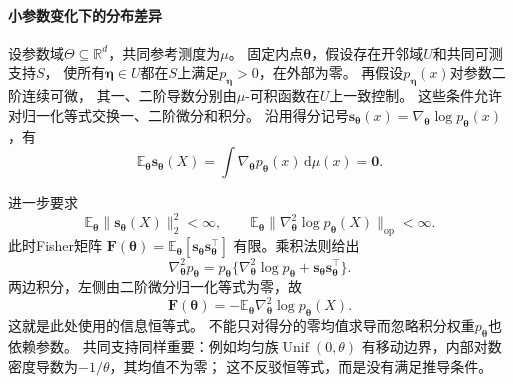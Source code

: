 \paragraph{小参数变化下的分布差异}
\label{sec:information-local-kl}

设参数域\(\Theta\subseteq\mathbb R^d\)，共同参考测度为\(\mu\)。
固定内点\(\bm\theta\)，假设存在开邻域\(U\)和共同可测支持\(S\)，
使所有\(\bm\eta\in U\)都在\(S\)上满足\(p_{\bm\eta}>0\)，在外部为零。
再假设\(p_{\bm\eta}(x)\)对参数二阶连续可微，
其一、二阶导数分别由\(\mu\)-可积函数在\(U\)上一致控制。
这些条件允许对归一化等式交换一、二阶微分和积分。
沿用得分记号\(\bm s_{\bm\theta}(x)=\nabla_{\bm\theta}\log p_{\bm\theta}(x)\)，有
\begin{equation}
  \mathbb E_{\bm\theta}\bm s_{\bm\theta}(X)
  =\int\nabla_{\bm\theta}p_{\bm\theta}(x)\,\mathrm d\mu(x)=\bm0.
  \label{eq:information-score-zero}
\end{equation}

进一步要求
\[
  \mathbb E_{\bm\theta}\|\bm s_{\bm\theta}(X)\|_2^2<\infty,\qquad
  \mathbb E_{\bm\theta}
  \|\nabla^2_{\bm\theta}\log p_{\bm\theta}(X)\|_{\mathrm{op}}<\infty.
\]
此时Fisher矩阵
\(\bm F(\bm\theta)=\mathbb E_{\bm\theta}[\bm s_{\bm\theta}\bm s_{\bm\theta}^\top]\)
有限。乘积法则给出
\[
  \nabla^2_{\bm\theta}p_{\bm\theta}
  =p_{\bm\theta}
   \{\nabla^2_{\bm\theta}\log p_{\bm\theta}
      +\bm s_{\bm\theta}\bm s_{\bm\theta}^\top\}.
\]
两边积分，左侧由二阶微分归一化等式为零，故
\begin{equation}
  \bm F(\bm\theta)
  =-\mathbb E_{\bm\theta}\nabla^2_{\bm\theta}\log p_{\bm\theta}(X).
  \label{eq:information-fisher-hessian-identity}
\end{equation}
这就是此处使用的信息恒等式。
不能只对得分的零均值求导而忽略积分权重\(p_{\bm\theta}\)也依赖参数。
共同支持同样重要：例如均匀族\(\operatorname{Unif}(0,\theta)\)
有移动边界，内部对数密度导数为\(-1/\theta\)，其均值不为零；
这不反驳恒等式，而是没有满足推导条件。

